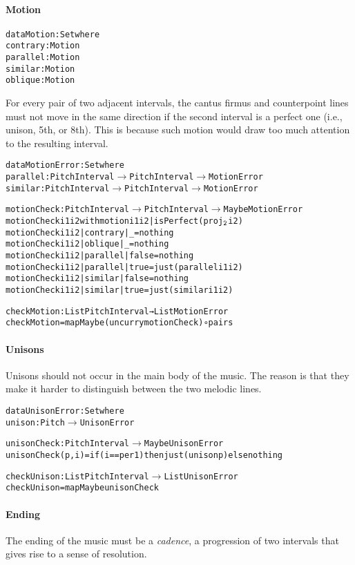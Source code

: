 \paragraph{Motion}

\begin{alltt}
data Motion : Set where
contrary : Motion
parallel : Motion
similar  : Motion
oblique  : Motion
\end{alltt}

For every pair of two adjacent intervals, the cantus firmus and
counterpoint lines must not move in the same direction if the second
interval is a perfect one (i.e., unison, 5th, or 8th).
This is because such motion would draw too much attention to the
resulting interval.

\begin{alltt}
data MotionError : Set where
  parallel : PitchInterval \(\rightarrow\) PitchInterval \(\rightarrow\) MotionError
  similar  : PitchInterval \(\rightarrow\) PitchInterval \(\rightarrow\) MotionError

motionCheck : PitchInterval \(\rightarrow\) PitchInterval \(\rightarrow\) Maybe MotionError
motionCheck i1 i2 with motion i1 i2 | isPerfect (proj\(\sb{\mathtt{2}}\) i2)
motionCheck i1 i2 | contrary | \_     = nothing
motionCheck i1 i2 | oblique  | \_     = nothing
motionCheck i1 i2 | parallel | false = nothing
motionCheck i1 i2 | parallel | true  = just (parallel i1 i2)
motionCheck i1 i2 | similar  | false = nothing
motionCheck i1 i2 | similar  | true  = just (similar i1 i2)

checkMotion : List PitchInterval → List MotionError
checkMotion = mapMaybe (uncurry motionCheck) ∘ pairs  
\end{alltt}

\paragraph{Unisons}
Unisons should not occur in the main body of the music.
The reason is that they make it harder to distinguish between
the two melodic lines.

\begin{alltt}
data UnisonError : Set where
  unison : Pitch \(\rightarrow\) UnisonError

unisonCheck : PitchInterval \(\rightarrow\) Maybe UnisonError
unisonCheck (p , i) = if (i == per1) then just (unison p) else nothing

checkUnison : List PitchInterval \(\rightarrow\) List UnisonError
checkUnison = mapMaybe unisonCheck
\end{alltt}

\paragraph{Ending}
The ending of the music must be a \emph{cadence}, a progression
of two intervals that gives rise to a sense of resolution.